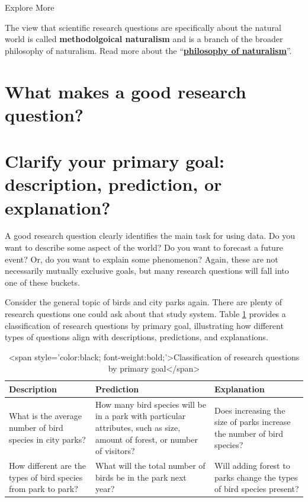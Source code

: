 \documentclass[
]{book}
\begin{document}
Explore More

The view that scientific research questions are specifically about the natural world is called \textbf{methodolgoical naturalism} and is a branch of the broader philosophy of naturalism. Read more about the ``\href{https://plato.stanford.edu/entries/naturalism/}{\textbf{philosophy of naturalism}}''.

\section{What makes a good research question?}\label{what-makes-a-good-research-question}

\section{Clarify your primary goal: description, prediction, or explanation?}\label{clarify-your-primary-goal-description-prediction-or-explanation}

A good research question clearly identifies the main task for using data. Do you want to describe some aspect of the world? Do you want to forecast a future event? Or, do you want to explain some phenomenon? Again, these are not necessarily mutually exclusive goals, but many research questions will fall into one of these buckets.

Consider the general topic of birds and city parks again. There are plenty of research questions one could ask about that study system. Table \ref{tab:c2t1} provides a classification of research questions by primary goal, illustrating how different types of questions align with descriptions, predictions, and explanations.

\begin{table}
\centering
\caption{\label{tab:c2t1}<span style='color:black; font-weight:bold;'>Classification of research questions by primary goal</span>}
\centering
\begin{tabular}[t]{l|l|l}
\hline
Description & Prediction & Explanation\\
\hline
What is the average number of bird species in city parks? & How many bird species will be in a park with particular attributes, such as size, amount of forest, or number of visitors? & Does increasing the size of parks increase the number of bird species?\\
\hline
How different are the types of bird species from park to park? & What will the total number of birds be in the park next year? & Will adding forest to parks change the types of bird species present?\\
\hline
\end{tabular}
\end{table}
\end{document}
